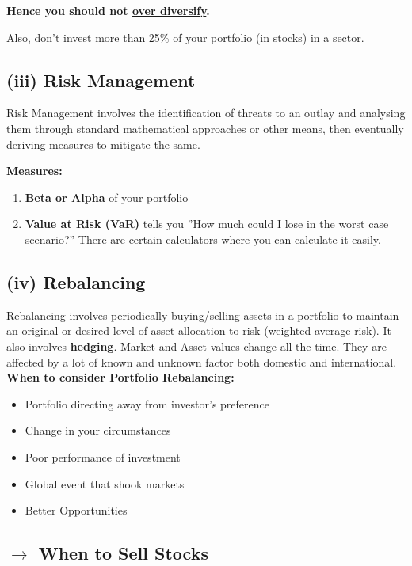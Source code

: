 \documentclass[12pt]{article}
\begin{document}
\noindent\textbf{Hence you should not \underline{over diversify}.}

Also, don't invest more than 25\% of your portfolio (in stocks) in a sector.

\subsection*{(iii) Risk Management}
Risk Management involves the identification of threats to an outlay and analysing them through standard mathematical approaches or other means, then eventually deriving measures to mitigate the same.

\textbf{Measures:}
\begin{enumerate}
    \item \textbf{Beta or Alpha} of your portfolio
    \item \textbf{Value at Risk (VaR)} tells you ''How much could I lose in the worst case scenario?'' There are certain calculators where you can calculate it easily.
\end{enumerate}

\subsection*{(iv) Rebalancing}
Rebalancing involves periodically buying/selling assets in a portfolio to maintain an original or desired level of asset allocation to risk (weighted average risk). It also involves \textbf{hedging}. Market and Asset values change all the time. They are affected by a lot of known and unknown factor both domestic and international.\\
\textbf{When to consider Portfolio Rebalancing:}
\begin{itemize}
  \item Portfolio directing away from investor's preference
  \item Change in your circumstances
  \item Poor performance of investment
  \item Global event that shook markets
  \item Better Opportunities
\end{itemize}

\subsection*{$\rightarrow$ When to Sell Stocks}
\end{document}
